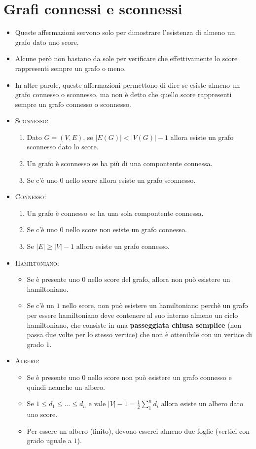 \documentclass[10pt]{article}
\begin{document}
	\section{Grafi connessi e sconnessi}
	\begin{itemize}
	\item
	Queste affermazioni servono solo per dimostrare l'esistenza di almeno un grafo dato uno score. 
	\item	
	Alcune però non bastano da sole per verificare che effettivamente lo score rappresenti sempre un grafo o meno.
	\item
	In altre parole, queste affermazioni permettono di dire se esiste almeno un grafo connesso o sconnesso, ma non è detto che quello score rappresenti sempre un grafo connesso o sconnesso.
	
	\item
	\textsc{Sconnesso:}
	\begin{enumerate}
	\item
	Dato $G = (V,E)$, se $|E(G)| < |V(G)| - 1$ allora esiste un grafo sconnesso dato lo score.
	\item
	Un grafo è sconnesso se ha più di una compontente connessa.
	\item
	Se c'è uno $0$ nello score allora esiste un grafo sconnesso.
	\end{enumerate}
	\item
	\textsc{Connesso:}
	\begin{enumerate}
	\item
	Un grafo è connesso se ha una sola compontente connessa.
	\item
	Se c'è uno $0$ nello score non esiste un grafo connesso.
	\item
	Se $|E| \geq |V|-1$ allora esiste un grafo connesso.
	\end{enumerate}		
	
	\item
	\textsc{Hamiltoniano:}
	\begin{itemize}
	\item
	Se è presente uno $0$ nello score del grafo, allora non può esistere un hamiltoniano.
	\item
	Se c'è un $1$ nello score, non può esistere un hamiltoniano perchè un grafo per essere hamiltoniano deve contenere al suo interno almeno un ciclo hamiltoniano, che consiste in una \textbf{passeggiata chiusa semplice} (non passa due volte per lo stesso vertice) che non è ottenibile con un vertice di grado $1$.
	\end{itemize}
	
	\item
	\textsc{Albero:}
	\begin{itemize}
	\item
	Se è presente uno $0$ nello score non può esistere un grafo connesso e quindi neanche un albero.
	\item
	Se $1 \leq d_1 \leq \dotso \leq d_n$ e vale $\displaystyle {|V|-1 = \frac{1}{2} \sum_{1}^{n} d_i}$ allora esiste un albero dato uno score.
	\item
	Per essere un albero (finito), devono esserci almeno due foglie (vertici con grado uguale a $1$).
	\end{itemize}
	
	\end{itemize}
\end{document}
